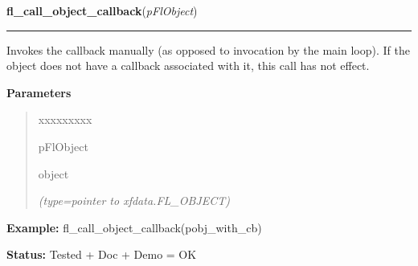     \vspace{0.5ex}

\hspace{.8\funcindent}\begin{boxedminipage}{\funcwidth}

    \raggedright \textbf{fl\_call\_object\_callback}(\textit{pFlObject})

    \vspace{-1.5ex}

    \rule{\textwidth}{0.5\fboxrule}
\setlength{\parskip}{2ex}
    Invokes the callback manually (as opposed to invocation by the main 
    loop). If the object does not have a callback associated with it, this 
    call has not effect.

\setlength{\parskip}{1ex}
      \textbf{Parameters}
      \vspace{-1ex}

      \begin{quote}
        \begin{Ventry}{xxxxxxxxx}

          \item[pFlObject]

          object

            {\it (type=pointer to xfdata.FL\_OBJECT)}

        \end{Ventry}

      \end{quote}

\textbf{Example:} fl\_call\_object\_callback(pobj\_with\_cb)



\textbf{Status:} Tested + Doc + Demo = OK



    \end{boxedminipage}

    \label{xformslib:flbasic:fl_set_object_prehandler}

    \vspace{0.5ex}

